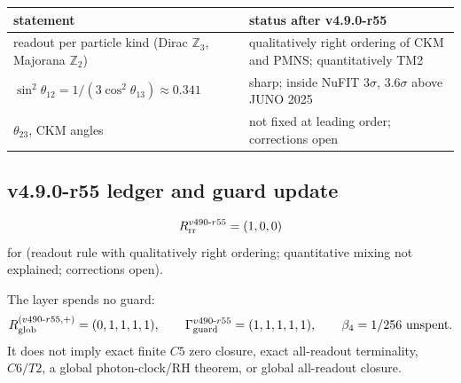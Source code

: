 \begin{center}
\small
\begin{tabular}{@{}>{\raggedright\arraybackslash}p{}>{\raggedright\arraybackslash}p{}@{}}
\toprule
statement & status after v4.9.0-r55\\
\midrule
readout per particle kind (Dirac \(\mathbb Z_3\), Majorana \(\mathbb Z_2\)) & qualitatively right ordering of CKM and PMNS; quantitatively TM2\\
\(\sin^2\theta_{12}=1/(3\cos^2\theta_{13})\approx0.341\) & sharp; inside NuFIT \(3\sigma\), \(3.6\sigma\) above JUNO 2025\\
\(\theta_{23}\), CKM angles & not fixed at leading order; corrections open\\
\bottomrule
\end{tabular}
\end{center}

\subsection*{v4.9.0-r55 ledger and guard update}
\label{subsec:v490-r55-ledger-guard}

\[
R_{\rm rr}^{v490\text{-}r55}=(1,0,0)
\]
for (readout rule with qualitatively right ordering; quantitative mixing not explained; corrections open).

The layer spends no guard:
\[
R_{\rm glob}^{(v490\text{-}r55,+)}=(0,1,1,1,1),
\qquad
\Gamma_{\rm guard}^{v490\text{-}r55}=(1,1,1,1,1),
\qquad
\beta_4=1/256\ \text{unspent}.
\]
It does not imply exact finite \(C5\) zero closure, exact all-readout terminality,
\(C6/T2\), a global photon-clock/RH theorem, or global all-readout closure.
